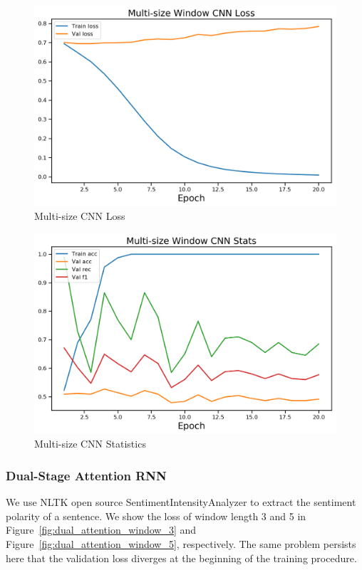 \documentclass[11pt,a4paper]{article}
\begin{document}
\begin{figure}
  \centering
  \includegraphics[width=\linewidth]{multi_size_cnn_loss}
  \caption{Multi-size CNN Loss}
  \label{fig:multi_size_cnn_loss}
\end{figure}

\begin{figure}
  \centering
  \includegraphics[width=\linewidth]{multi_size_cnn_stats}
  \caption{Multi-size CNN Statistics}
  \label{fig:multi_size_cnn_stats}
\end{figure}


\subsubsection{Dual-Stage Attention RNN}
We use NLTK \cite{nltk} open source SentimentIntensityAnalyzer to extract the sentiment polarity of a sentence. We show the loss of window length 3 and 5 in Figure~\ref{fig:dual_attention_window_3} and Figure~\ref{fig:dual_attention_window_5}, respectively. The same problem persists here that the validation loss diverges at the beginning of the training procedure.
\end{document}
